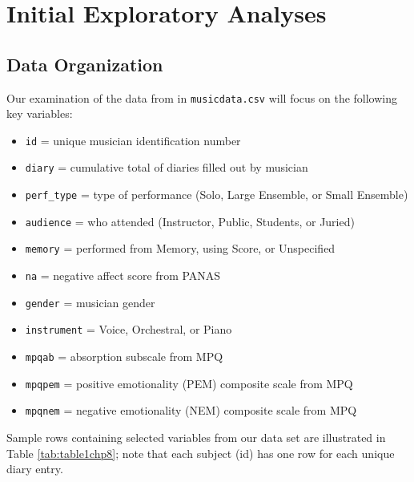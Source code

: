 \documentclass[
]{krantz}
\providecommand{\tightlist}{%
  \setlength{\itemsep}{0pt}\setlength{\parskip}{0pt}}
\begin{document}
\hypertarget{explore}{%
\section{Initial Exploratory Analyses}\label{explore}}

\hypertarget{organizedata1}{%
\subsection{Data Organization}\label{organizedata1}}

Our examination of the data from \citet{Miller2010} in \texttt{musicdata.csv} will focus on the following key variables:

\begin{itemize}
\tightlist
\item
  \texttt{id} = unique musician identification number
\item
  \texttt{diary} = cumulative total of diaries filled out by musician
\item
  \texttt{perf\_type} = type of performance (Solo, Large Ensemble, or Small Ensemble)
\item
  \texttt{audience} = who attended (Instructor, Public, Students, or Juried)
\item
  \texttt{memory} = performed from Memory, using Score, or Unspecified
\item
  \texttt{na} = negative affect score from PANAS
\item
  \texttt{gender} = musician gender
\item
  \texttt{instrument} = Voice, Orchestral, or Piano
\item
  \texttt{mpqab} = absorption subscale from MPQ
\item
  \texttt{mpqpem} = positive emotionality (PEM) composite scale from MPQ
\item
  \texttt{mpqnem} = negative emotionality (NEM) composite scale from MPQ
\end{itemize}

Sample rows containing selected variables from our data set are illustrated in Table \ref{tab:table1chp8}; note that each subject (id) has one row for each unique diary entry.
\end{document}
